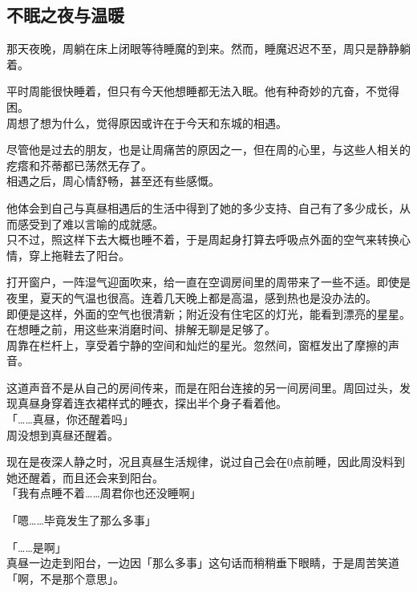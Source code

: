 \subsection{不眠之夜与温暖}

那天夜晚，周躺在床上闭眼等待睡魔的到来。然而，睡魔迟迟不至，周只是静静躺着。

平时周能很快睡着，但只有今天他想睡都无法入眠。他有种奇妙的亢奋，不觉得困。\\

周想了想为什么，觉得原因或许在于今天和东城的相遇。

尽管他是过去的朋友，也是让周痛苦的原因之一，但在周的心里，与这些人相关的疙瘩和芥蒂都已荡然无存了。\\

相遇之后，周心情舒畅，甚至还有些感慨。

他体会到自己与真昼相遇后的生活中得到了她的多少支持、自己有了多少成长，从而感受到了难以言喻的成就感。\\

只不过，照这样下去大概也睡不着，于是周起身打算去呼吸点外面的空气来转换心情，穿上拖鞋去了阳台。

打开窗户，一阵湿气迎面吹来，给一直在空调房间里的周带来了一些不适。即使是夜里，夏天的气温也很高。连着几天晚上都是高温，感到热也是没办法的。\\

即便是这样，外面的空气也很清新；附近没有住宅区的灯光，能看到漂亮的星星。在想睡之前，用这些来消磨时间、排解无聊是足够了。\\

周靠在栏杆上，享受着宁静的空间和灿烂的星光。忽然间，窗框发出了摩擦的声音。

这道声音不是从自己的房间传来，而是在阳台连接的另一间房间里。周回过头，发现真昼身穿着连衣裙样式的睡衣，探出半个身子看着他。\\

「……真昼，你还醒着吗」\\

周没想到真昼还醒着。

现在是夜深人静之时，况且真昼生活规律，说过自己会在0点前睡，因此周没料到她还醒着，而且还会来到阳台。\\

「我有点睡不着……周君你也还没睡啊」

「嗯……毕竟发生了那么多事」

「……是啊」\\

真昼一边走到阳台，一边因「那么多事」这句话而稍稍垂下眼睛，于是周苦笑道「啊，不是那个意思」。\\

